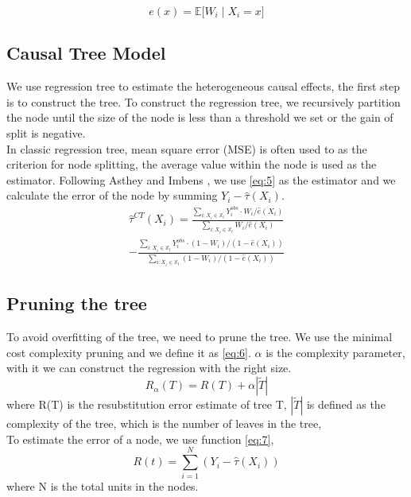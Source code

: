 \begin{equation}\label{eq:4.5}
e(x) = \mathbb{E} \big[  W_{i} \mid X_{i} =  x \big]
\end{equation}

\subsection{Causal Tree Model}
We use regression tree to estimate the heterogeneous causal effects, the first step is to construct the tree. To construct the regression tree, we recursively partition the node until the size of the node is less than a threshold we set or the gain of split is negative.\\
In classic regression tree, mean square error (MSE) is often used to as the criterion for node splitting, the average value within the node is used as the estimator. Following Asthey and Imbens \cite{1504.01132}, we use \ref{eq:5} as the estimator and we calculate the error of the node by summing $Y_{i} - \hat{\tau}(X_{i})$.
\begin{equation} \label{eq:5}
\begin{split}
\hat{\tau}^{CT}(X_{i}) =  \frac{\sum_{i:X_{i} \in \mathbb{X}_{l}}  Y_{i}^{obs} \cdot W_{i} / \hat{e}(X_{i})  }{\sum_{i:X_{i} \in \mathbb{X}_{l}}  W_{i} / \hat{e}(X_{i})}  \\
 - \frac{\sum_{i:X_{i} \in \mathbb{X}_{l}}  Y_{i}^{obs} \cdot (1 - W_{i}) / (1 - \hat{e}(X_{i}))  }{\sum_{i:X_{i} \in \mathbb{X}_{l}}  (1 - W_{i}) / (1 - \hat{e}(X_{i}))}
 \end{split}
\end{equation}

\subsection{Pruning the tree}

To avoid overfitting of the tree, we need to prune the tree. We use the minimal cost complexity pruning and we define it as \ref{eq:6}. $\alpha$ is the complexity parameter, with it we can construct the regression with the right size.
\begin{equation}\label{eq:6}
R_{\alpha}(T) = R(T) + \alpha \left|\tilde{T}\right|
\end{equation}
where R(T) is the resubstitution error estimate of tree T, $\left|\tilde{T}\right|$ is defined as the complexity of the tree, which is the number of leaves in the tree,\\
To estimate the error of a node, we use function \ref{eq:7},
\begin{equation}\label{eq:7}
R(t) = \sum_{i=1}^{N}(Y_{i} - \hat{\tau}(X_{i}))
\end{equation}
where N is the total units in the nodes. \\

